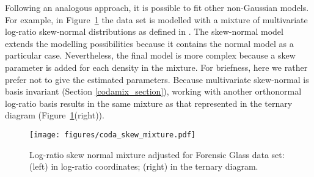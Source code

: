 \documentclass[12pt, a4paper]{article}
\begin{document}
Following an analogous approach, it is possible to fit other non-Gaussian models. For example, in Figure~\ref{skewcodadist} the data set is modelled with a mixture of multivariate log-ratio skew-normal distributions as defined in \cite{prates2013mixsmsn}. The skew-normal model extends the modelling possibilities because it contains the normal model as a particular case. Nevertheless, the final model is more complex because a skew parameter is added for each density in the mixture. For briefness, here we rather prefer not to give the estimated parameters. Because multivariate skew-normal is basis invariant  (Section \ref{codamix_section}), working with another orthonormal log-ratio basis results in the same mixture as that represented in the ternary diagram (Figure~\ref{skewcodadist}(right)). 

\begin{figure}[htbp]
\centering
\texttt{[image: figures/coda\_skew\_mixture.pdf]}\\%
\caption{Log-ratio skew normal mixture adjusted for Forensic Glass data set: (left) in log-ratio coordinates; (right) in the ternary diagram.}
\label{skewcodadist}
\end{figure}


% 
\end{document}
